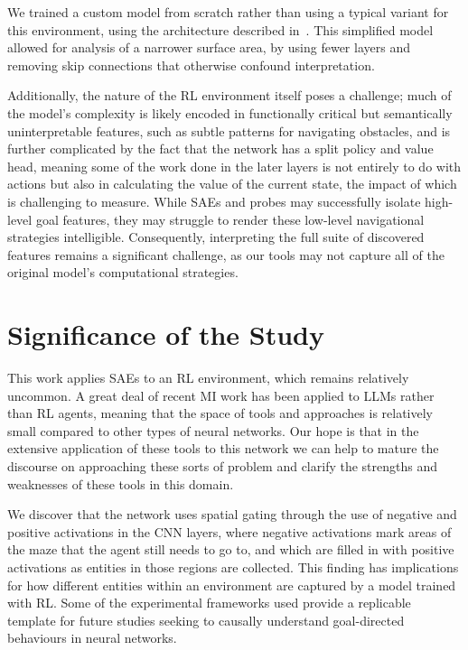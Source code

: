 We trained a custom model from scratch rather than using a typical variant for this environment, using the architecture described in~\citet{hilton_2020_understanding}. This simplified model allowed for analysis of a narrower surface area, by using fewer layers and removing skip connections that otherwise confound interpretation.

Additionally, the nature of the RL environment itself poses a challenge; much of the model's complexity is likely encoded in functionally critical but semantically uninterpretable features, such as subtle patterns for navigating obstacles, and is further complicated by the fact that the network has a split policy and value head, meaning some of the work done in the later layers is not entirely to do with actions but also in calculating the value of the current state, the impact of which is challenging to measure. While SAEs and probes may successfully isolate high-level goal features, they may struggle to render these low-level navigational strategies intelligible. Consequently, interpreting the full suite of discovered features remains a significant challenge, as our tools may not capture all of the original model's computational strategies.


\section{Significance of the Study}\label{sec:significance}
This work applies SAEs to an RL environment, which remains relatively uncommon. A great deal of recent MI work has been applied to LLMs rather than RL agents, meaning that the space of tools and approaches is relatively small compared to other types of neural networks. Our hope is that in the extensive application of these tools to this network we can help to mature the discourse on approaching these sorts of problem and clarify the strengths and weaknesses of these tools in this domain. 

We discover that the network uses spatial gating through the use of negative and positive activations in the CNN layers, where negative activations mark areas of the maze that the agent still needs to go to, and which are filled in with positive activations as entities in those regions are collected. This finding has implications for how different entities within an environment are captured by a model trained with RL. Some of the experimental frameworks used provide a replicable template for future studies seeking to causally understand goal-directed behaviours in neural networks.

